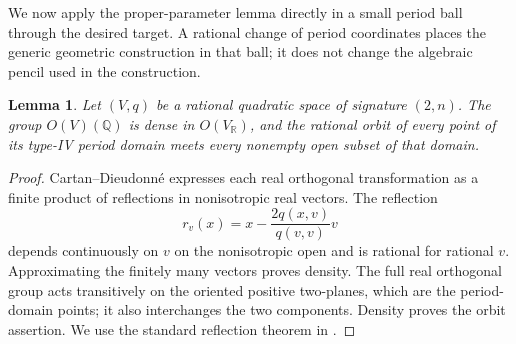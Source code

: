 \documentclass[11pt]{amsart}
\newcommand{\Q}{\mathbb Q}
\newcommand{\R}{\mathbb R}
\newtheorem{lemma}[theorem]{Lemma}
\theoremstyle{definition}
\theoremstyle{remark}
\numberwithin{equation}{section}
\begin{document}
We now apply the proper-parameter lemma directly in a small period ball
through the desired target.  A rational change of period coordinates
places the generic geometric construction in that ball; it does not
change the algebraic pencil used in the construction.

\begin{lemma}\label{specialization:rational-density}
Let $(V,q)$ be a rational quadratic space of signature $(2,n)$.
The group $O(V)(\Q)$ is dense in $O(V_{\R})$, and the rational orbit
of every point of its type-IV period domain meets every nonempty open
subset of that domain.
\end{lemma}
\begin{proof}
Cartan--Dieudonn\'e expresses each real orthogonal transformation as
a finite product of reflections in nonisotropic real vectors.  The
reflection
\[
 r_v(x)=x-\frac{2q(x,v)}{q(v,v)}v
\]
depends continuously on $v$ on the nonisotropic open and is rational
for rational $v$.  Approximating the finitely many vectors proves
density.  The full real orthogonal group acts transitively on the
oriented positive two-planes, which are the period-domain points;
it also interchanges the two components.  Density proves the orbit
assertion.  We use the standard reflection theorem in
\cite[Theorem~7.2.4]{PetersSterk}.
\end{proof}
\end{document}
